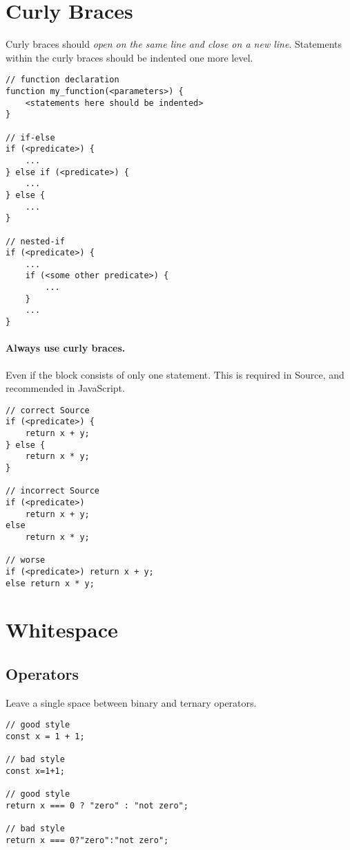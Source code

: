 \section*{Curly Braces}
  Curly braces should \emph{open on the same line and close on a new line}.
  Statements within the curly braces should be indented one more level.

\begin{lstlisting}
// function declaration
function my_function(<parameters>) {
    <statements here should be indented>
}

// if-else
if (<predicate>) {
    ...
} else if (<predicate>) {
    ...
} else {
    ...
}

// nested-if
if (<predicate>) {
    ...
    if (<some other predicate>) {
        ...
    }
    ...
}
\end{lstlisting}

\paragraph{Always use curly braces.} Even if the block consists of only 
  one statement.
  This is required in Source, and recommended in JavaScript.

\begin{lstlisting}
// correct Source
if (<predicate>) {
    return x + y;
} else {
    return x * y;
}

// incorrect Source
if (<predicate>) 
    return x + y;
else 
    return x * y;

// worse
if (<predicate>) return x + y;
else return x * y;
\end{lstlisting}

\section*{Whitespace}

  \subsection*{Operators}
    Leave a single space between binary and ternary operators.
	
\begin{lstlisting}
// good style
const x = 1 + 1;

// bad style
const x=1+1;

// good style
return x === 0 ? "zero" : "not zero";

// bad style
return x === 0?"zero":"not zero";
\end{lstlisting}
	
